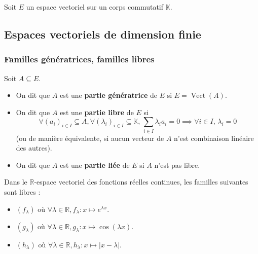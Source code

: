 




  Soit $E$ un espace vectoriel sur un corps commutatif $\mathbb{K}$.

  \subsection{Espaces vectoriels de dimension finie}

  \subsubsection{Familles génératrices, familles libres}


  \begin{definition}
    Soit $A \subseteq E$.
    \begin{itemize}
      \item On dit que $A$ est une \textbf{partie génératrice} de $E$ si $E = \operatorname{Vect}(A)$.
      \item On dit que $A$ est une \textbf{partie libre} de $E$ si
      \[ \forall (a_i)_{i \in I} \subseteq A, \forall (\lambda_i)_{i \in I} \subseteq \mathbb{K}, \, \sum_{i \in I} \lambda_i a_i = 0 \implies \forall i \in I, \, \lambda_i = 0 \]
      (ou de manière équivalente, si aucun vecteur de $A$ n'est combinaison linéaire des autres).
      \item On dit que $A$ est une \textbf{partie liée} de $E$ si $A$ n'est pas libre.
    \end{itemize}
  \end{definition}

  \begin{example}
    Dans le $\mathbb{R}$-espace vectoriel des fonctions réelles continues, les familles suivantes sont libres :
    \begin{itemize}
      \item $(f_\lambda)$ où $\forall \lambda \in \mathbb{R}, f_\lambda : x \mapsto e^{\lambda x}$.
      \item $(g_\lambda)$ où $\forall \lambda \in \mathbb{R}, g_\lambda : x \mapsto \cos(\lambda x)$.
      \item $(h_\lambda)$ où $\forall \lambda \in \mathbb{R}, h_\lambda : x \mapsto |x - \lambda|$.
    \end{itemize}
  \end{example}

